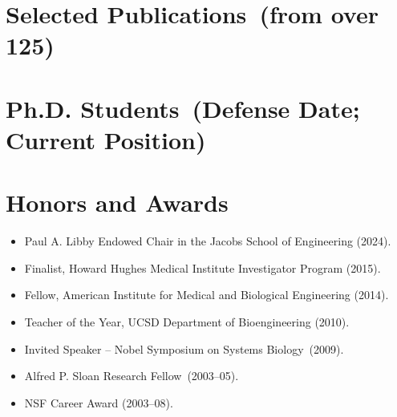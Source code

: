 \documentclass[11pt,a4paper,sans]{moderncv}        %
\makeatletter
\renewcommand*{\bibliographyitemlabel}{\@biblabel{\arabic{enumiv}}}
\makeatother
\begin{document}
\section{Selected Publications~(from over 125)} %
\vspace{-.2in}
\renewcommand{\refname}{}
\nocite{*}

%
%  

%
%   


    
 


\section{Ph.D. Students~(Defense Date; Current Position)}


\section{Honors and Awards}
\begin{itemize}

\item Paul A. Libby Endowed Chair in the Jacobs School of Engineering (2024). 

\item Finalist, Howard Hughes Medical Institute Investigator Program (2015). 

\item Fellow, American Institute for Medical and Biological Engineering (2014). 

\item Teacher of the Year, UCSD Department of Bioengineering (2010).

\item Invited Speaker -- Nobel Symposium on Systems Biology~(2009).

\item Alfred P. Sloan Research Fellow~(2003--05).

\item NSF Career Award (2003--08).

\end{itemize}
\end{document}
